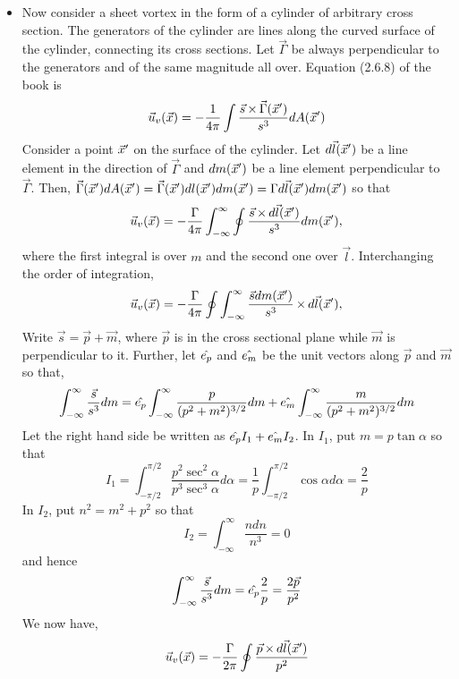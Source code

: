 \begin{itemize}
\item Now consider a sheet vortex in the form of a cylinder of arbitrary cross section. The generators of the cylinder are lines along the curved surface of the cylinder, connecting its
cross sections. Let $\vec{\Gamma}$ be always perpendicular to the generators and of the same magnitude all over. Equation (2.6.8) of the book is
\[
\vec{u}_v(\vec{x}) = -\frac{1}{4\pi}\int\frac{\vec{s}\operatorname{\times}\vec{\Gamma}(\vec{x}^\prime)}{s^3} dA(\vec{x}^\prime)
\]
Consider a point $\vec{x}^\prime$ on the surface of the cylinder. Let $d\vec{l}(\vec{x}^\prime)$ be a line element in the direction of $\vec{\Gamma}$ and $dm(\vec{x}^\prime)$ be a line 
element perpendicular to $\vec{\Gamma}$. Then, $\vec{\Gamma}(\vec{x}^\prime) dA(\vec{x}^\prime) = \vec{\Gamma}(\vec{x}^\prime) dl(\vec{x}^\prime) dm(\vec{x}^\prime) = 
\Gamma d\vec{l}(\vec{x}^\prime)dm(\vec{x}^\prime)$ so that
\[
\vec{u}_v(\vec{x}) = -\frac{\Gamma}{4\pi}\int_{-\infty}^\infty \oint \frac{\vec{s}\operatorname{\times} d\vec{l}(\vec{x}^\prime)}{s^3} dm(\vec{x}^\prime),
\]
where the first integral is over $m$ and the second one over $\vec{l}$. Interchanging the order of integration,
\[
\vec{u}_v(\vec{x}) = -\frac{\Gamma}{4\pi} \oint \int_{-\infty}^\infty \frac{\vec{s}dm(\vec{x}^\prime)}{s^3} \operatorname{\times} d\vec{l}(\vec{x}^\prime),
\]
Write $\vec{s} = \vec{p} + \vec{m}$, where $\vec{p}$ is in the cross sectional plane while $\vec{m}$ is perpendicular to it. Further, let $\hat{e_{p}}$ and $\hat{e_{m}}$ be the unit 
vectors along $\vec{p}$ and $\vec{m}$ so that,
\[
\int_{-\infty}^{\infty} \frac{\vec{s}}{s^3}dm = \hat{e_{p}}\int_{-\infty}^{\infty} \frac{p}{(p^2 + m^2)^{3/2}} dm + \hat{e_{m}}\int_{-\infty}^{\infty} \frac{m}{(p^2 + m^2)^{3/2}} dm
\]
Let the right hand side be written as $\hat{e_{p}}I_1 + \hat{e_{m}}I_2$. In $I_1$, put $m = p\tan\alpha$ so that
\[
I_1 = \int_{-\pi/2}^{\pi/2} \frac{p^2\sec^2\alpha}{p^3\sec^3\alpha} d\alpha = \frac{1}{p}\int_{-\pi/2}^{\pi/2}\cos\alpha d\alpha = \frac{2}{p}
\]
In $I_2$, put $n^2 = m^2 + p^2$ so that
\[
I_2 = \int_{-\infty}^{\infty} \frac{ndn}{n^3} = 0
\]
and hence
\[
\int_{-\infty}^{\infty} \frac{\vec{s}}{s^3}dm = \hat{e_{p}}\frac{2}{p} = \frac{2\vec{p}}{p^2}
\]
We now have,
\[
\vec{u}_v(\vec{x}) = -\frac{\Gamma}{2\pi}\oint\frac{\vec{p} \operatorname{\times} d\vec{l}(\vec{x}^\prime)}{p^2}
\]


\end{itemize}
